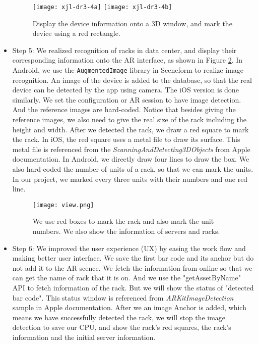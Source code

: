 \documentclass[11pt,a4paper]{article}
\begin{document}
\begin{onehalfspace}
\begin{itemize}
\begin{figure}[H]
	\centering
	{\texttt{[image: xjl-dr3-4a]}}
	\hspace{2cm} %
	{\texttt{[image: xjl-dr3-4b]}}
	\caption{Display the device information onto a 3D window, and mark the device using a red rectangle.}
	\label{xjl-dr3-4}
\end{figure}

\item Step 5: We realized recognition of racks in data center, and display their corresponding information onto the AR interface, as shown in Figure \ref{fig:view}. In Android, we use the \texttt{AugmentedImage} library in Sceneform to realize image recognition. An image of the device is added to the database, so that the real device can be detected by the app using camera. The iOS version is done similarly. We set the configuration or AR session to have image detection. And the reference images are hard-coded. Notice that besides giving the reference images, we also need to give the real size of the rack including the height and width. After we detected the rack, we draw a red square to mark the rack. In iOS, the red square uses a metal file to draw its surface. This metal file is 
referenced from the \textit{ScanningAndDetecting3DObjects}\cite{zsy3} from Apple documentation. In Android, we directly draw four lines to draw the box. We also hard-coded the number of units of a rack, so that we can mark the units. In our project, we marked every three units with their numbers and one red line. 
\begin{figure}
    \centering
    \texttt{[image: view.png]}
    \caption{We use red boxes to mark the rack and also mark the unit numbers. We also show the information of servers and racks.}
    \label{fig:view}
\end{figure}

\item Step 6: We improved the user experience (UX) by easing the work flow and making better user interface. We save the first bar code and its anchor but do not add it to the AR scence. We fetch the information from online so that we can get the name of rack that it is on. And we use the "getAssetByName" API to fetch information of the rack. But we will show the status of "detected bar code". This status window is referenced from \textit{ARKitImageDetection}\cite{zsy4} sample in Apple documentation. After we an image Anchor is added, which means we have successfully detected the rack, we will stop the image detection to save our CPU, and show the rack's red squares, the rack's information and the initial server information.


\end{itemize}
\end{onehalfspace}
\end{document}
